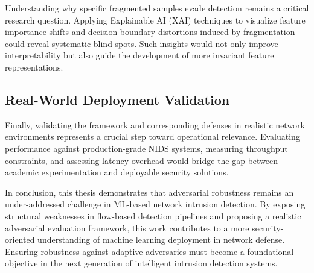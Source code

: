 Understanding why specific fragmented samples evade detection remains a critical research question. Applying Explainable AI (XAI) techniques to visualize feature importance shifts and decision-boundary distortions induced by fragmentation could reveal systematic blind spots. Such insights would not only improve interpretability but also guide the development of more invariant feature representations.

\subsection{Real-World Deployment Validation}

Finally, validating the framework and corresponding defenses in realistic network environments represents a crucial step toward operational relevance. Evaluating performance against production-grade NIDS systems, measuring throughput constraints, and assessing latency overhead would bridge the gap between academic experimentation and deployable security solutions.

\bigskip

In conclusion, this thesis demonstrates that adversarial robustness remains an under-addressed challenge in ML-based network intrusion detection. By exposing structural weaknesses in flow-based detection pipelines and proposing a realistic adversarial evaluation framework, this work contributes to a more security-oriented understanding of machine learning deployment in network defense. Ensuring robustness against adaptive adversaries must become a foundational objective in the next generation of intelligent intrusion detection systems.